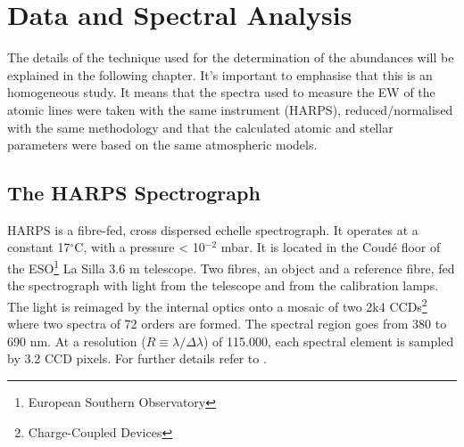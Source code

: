 \documentclass[dvips,12pt,a4paper]{report}
\begin{document}
{%

\chapter {Data and Spectral Analysis}
\label{chap_3}
The details of the technique used for the determination of the abundances will be explained in the following chapter.  It's important to emphasise that this is an homogeneous study. It means that the spectra used to measure the EW of the atomic lines were taken with the same instrument (HARPS), reduced/normalised with the same methodology and that the calculated atomic and stellar parameters were based on the same atmospheric models.

\section {The HARPS Spectrograph}


HARPS is a fibre-fed, cross dispersed echelle spectrograph. It operates at a constant 17$^\circ$C, with a pressure < 10$^{-2}$ mbar. It is located in the Coud\'{e} floor of the ESO\footnote{European Southern Observatory} La Silla 3.6 m telescope. Two fibres, an object and a reference fibre, fed the spectrograph with light from the telescope and from the calibration lamps. The light is reimaged by the internal optics onto a mosaic of two 2k4 CCDs\footnote{Charge-Coupled Devices} where two spectra of 72 orders are formed. The spectral region goes from 380 to 690 nm. At a resolution ($R\equiv\lambda/\Delta\lambda$) of 115.000, each spectral element is sampled by 3.2 CCD pixels. For further details refer to \citet{Mayor-2003b}. 


}
\end{document}

